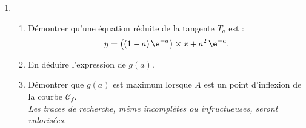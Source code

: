 \begin{enumerate}
	\item[]
	\begin{enumerate}
		\item Démontrer qu’une équation réduite de la tangente $T_a$ est : \[y=\left( (1-a)\,\e^{-a} \right) \times x + a^2 \, \e^{-a}.\]
		\item En déduire l'expression de $g(a)$.
		\item Démontrer que $g(a)$ est maximum lorsque $A$ est un point d'inflexion de la courbe $\mathcal{C}_f$.\\
		\emph{Les traces de recherche, même incomplètes ou infructueuses, seront valorisées.}
	\end{enumerate}
\end{enumerate}
